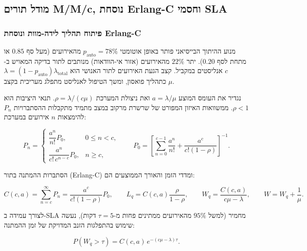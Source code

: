 \subsection{מודל תורים \textenglish{M/M/c}, נוסחת \textenglish{Erlang-C} וחסמי \textenglish{SLA}}
\label{subsec:mmc-queue}

\subsubsection{פיתוח תהליך לידה-מוות ונוסחת \textenglish{Erlang-C}}
מנוע ההיתוך הבייסיאני פותר באופן אוטומטי $p_{\text{auto}} = 78\%$ מהאירועים (מעל סף $0.85$ או מתחת לסף $0.20$). יתר $22\%$ מהאירועים (אזור אי-הוודאות) מנותבים לתור בדיקה המאויש ב-$c$ אנליסטים במקביל. קצב הגעת האירועים לתור האנושי הוא $\lambda = (1 - p_{\text{auto}})\lambda_{\text{total}}$ כתהליך פואסון, ומשך הטיפול לאנליסט מתפלג מעריכית בקצב $\mu$.

נגדיר את העומס המוצע $a = \lambda/\mu$ ואת ניצולת המערכת $\rho = \lambda/(c\mu)$. תנאי היציבות הוא $\rho < 1$. ממשוואות האיזון המפורט של שרשרת מרקוב במצב מתמיד מתקבלות ההסתברויות $P_n$ להימצאות $n$ אירועים במערכת:
\begin{english}
\begin{equation}
P_n = \begin{cases}
\dfrac{a^n}{n!} P_0, & 0 \le n < c, \\[8pt]
\dfrac{a^n}{c!\, c^{n-c}} P_0, & n \ge c,
\end{cases}
\qquad
P_0 = \left[ \sum_{n=0}^{c-1} \frac{a^n}{n!} + \frac{a^c}{c!(1-\rho)} \right]^{-1}.
\label{eq:mmc-pn}
\end{equation}
\end{english}
הסתברות ההמתנה בתור (\textenglish{Erlang-C}) ומדדי הזמן והאורך הממוצעים הם:
\begin{english}
\begin{equation}
C(c,a) = \sum_{n=c}^{\infty} P_n = \frac{a^c}{c!(1-\rho)} P_0, \qquad
L_q = C(c,a)\frac{\rho}{1-\rho}, \qquad
W_q = \frac{C(c,a)}{c\mu - \lambda}, \qquad
W = W_q + \frac{1}{\mu}.
\label{eq:mmc-metrics}
\end{equation}
\end{english}
לצורך עמידה ב-\textenglish{SLA} מחמיר (למשל $95\%$ מהאירועים ממתינים פחות מ-$\tau = 5$ דקות), נעשה שימוש בהתפלגות הזנב המדויקת של זמן ההמתנה:
\begin{english}
\begin{equation}
P(W_q > \tau) = C(c,a)\, e^{-(c\mu - \lambda)\tau}.
\label{eq:mmc-sla-tail}
\end{equation}
\end{english}

